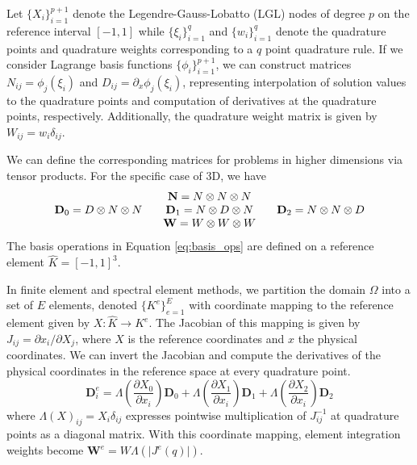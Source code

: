 Let $\lbrace X_i \rbrace_{i = 1}^{p + 1}$ denote the Legendre-Gauss-Lobatto (LGL) nodes of degree $p$ on the reference interval $\left[ -1, 1 \right]$ while $\lbrace \xi_i \rbrace_{i = 1}^q$ and $\lbrace w_i \rbrace_{i = 1}^q$ denote the quadrature points and quadrature weights corresponding to a $q$ point quadrature rule.
If we consider Lagrange basis functions $\lbrace \phi_i \rbrace_{i = 1}^{p + 1}$, we can construct matrices $N_{i j} = \phi_j \left( \xi_i \right)$ and $D_{i j} = \partial_x \phi_j \left( \xi_i \right)$, representing interpolation of solution values to the quadrature points and computation of derivatives at the quadrature points, respectively.
Additionally, the quadrature weight matrix is given by $W_{i j} = w_i \delta_{i j}$.

We can define the corresponding matrices for problems in higher dimensions via tensor products.
For the specific case of 3D, we have
\begin{equation}
\begin{tabular}{c}
$\mathbf{N}   = N \otimes N \otimes N$ \\
$\mathbf{D}_0 = D \otimes N \otimes N$ \hspace{5mm}
$\mathbf{D}_1 = N \otimes D \otimes N$ \hspace{5mm}
$\mathbf{D}_2 = N \otimes N \otimes D$ \\
$\mathbf{W}   = W \otimes W \otimes W$
\end{tabular}
\label{eq:basis_ops}
\end{equation}
The basis operations in Equation \ref{eq:basis_ops} are defined on a reference element $\hat{K} = \left[ -1, 1 \right]^3$.

In finite element and spectral element methods, we partition the domain $\Omega$ into a set of $E$ elements, denoted $\lbrace K^e \rbrace_{e = 1}^E$ with coordinate mapping to the reference element given by $X : \hat{K} \rightarrow K^e$.
The Jacobian of this mapping is given by $J_{i j} = \partial x_i / \partial X_j$, where $X$ is the reference coordinates and $x$ the physical coordinates.
We can invert the Jacobian and compute the derivatives of the physical coordinates in the reference space at every quadrature point.
\begin{equation}
\mathbf{D}_i^e = \Lambda \left( \frac{\partial X_0}{\partial x_i} \right) \mathbf{D}_0 + \Lambda \left( \frac{\partial X_1}{\partial x_i} \right) \mathbf{D}_1 + \Lambda \left( \frac{\partial X_2}{\partial x_i} \right) \mathbf{D}_2
\end{equation}
where $\Lambda \left( X \right)_{i j} = X_i \delta_{i j}$ expresses pointwise multiplication of $J_{i j}^{-1}$ at quadrature points as a diagonal matrix.
With this coordinate mapping, element integration weights become $\mathbf{W}^e = W \Lambda \left( \lvert J^e \left( q \right) \rvert \right)$.


